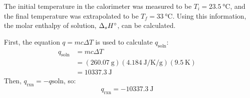 \documentclass[11pt, titlepage]{article}
\begin{document}
            \par
            The initial temperature in the calorimeter was measured to be $T_i=\SI{23.5}{\degreeCelsius}$, and the final temperature was extrapolated to be $T_f=\SI{33}{\degreeCelsius}$. Using this information, the molar enthalpy of solution, $\Delta_sH\degree$, can be calculated.
            \par\noindent
            First, the equation $q=mc\Delta T$ is used to calculate $q_\mathrm{soln}$:
            \begin{align*}
                q_\mathrm{soln}&=mc\Delta T \\
                &=(\SI{260.07}{\gram})(\SI{4.184}{\joule\per\kelvin\per\gram})(\SI{9.5}{\kelvin}) \\
                &=\SI{10337.3}{\joule}
            \end{align*}
            Then, $q_\mathrm{rxn}=-q\mathrm{soln}$, so:
            \begin{equation*}
                q_\mathrm{rxn}=-\SI{10337.3}{\joule}
            \end{equation*}
\end{document}
